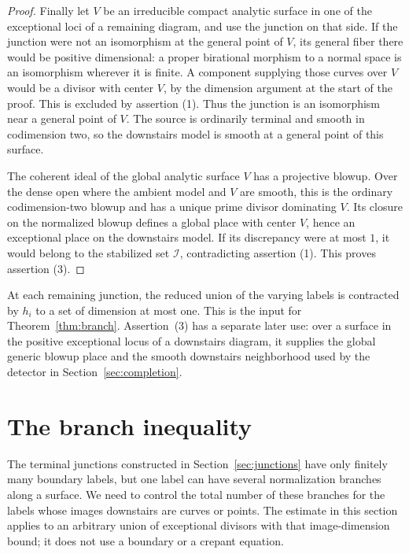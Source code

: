 \documentclass[11pt]{amsart}
\theoremstyle{definition}
\theoremstyle{remark}
\numberwithin{equation}{section}
\begin{document}
\begin{proof}
Finally let $V$ be an irreducible compact analytic surface in one of the exceptional loci of a
remaining diagram, and use the junction on that side.  If the junction
were not an isomorphism at the general point of $V$, its general fiber
there would be positive dimensional: a proper birational morphism to a
normal space is an isomorphism wherever it is finite.  A component
supplying those curves over $V$ would be a divisor with center $V$, by
the dimension argument at the start of the proof.  This is excluded by
assertion (1).  Thus the junction is an isomorphism near a general point
of $V$.  The source is ordinarily terminal and smooth in codimension two,
so the downstairs model is smooth at a general point of this surface.

The coherent ideal of the global analytic surface $V$ has a projective
blowup.  Over the dense open where the ambient model and $V$ are smooth,
this is the ordinary codimension-two blowup and has a unique prime
divisor dominating $V$.  Its closure on the normalized blowup defines
a global place with center $V$, hence an exceptional place on the
downstairs model.  If its discrepancy were at most $1$, it would belong
to the stabilized set $\mathcal I$, contradicting assertion (1).
This proves assertion (3).
\end{proof}

At each remaining junction, the reduced union of the varying labels is
contracted by $h_i$ to a set of dimension at most one.  This is the input
for Theorem~\ref{thm:branch}.  Assertion~(3) has a separate later use:
over a surface in the positive exceptional locus of a downstairs diagram,
it supplies the global generic blowup place and the smooth downstairs
neighborhood used by the detector in Section~\ref{sec:completion}.

\section{The branch inequality}
\label{sec:branch}

The terminal junctions constructed in Section~\ref{sec:junctions} have
only finitely many boundary labels, but one label can have several
normalization branches along a surface.  We need to control the total
number of these branches for the labels whose images downstairs are
curves or points.  The estimate in this section applies to an arbitrary
union of exceptional divisors with that image-dimension bound; it does
not use a boundary or a crepant equation.
\end{document}
